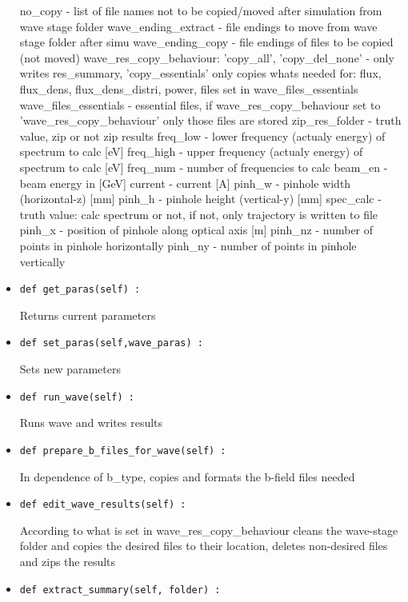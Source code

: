 \documentclass[
12pt,%
a4paper,  %
twoside        %
]{report}
\begin{document}
\begin{landscape}
\begin{itemize}
no\_copy - list of file names not to be copied/moved after simulation from wave stage folder
wave\_ending\_extract - file endings to move from wave stage folder after simu
wave\_ending\_copy - file endings of files to be copied (not moved)
wave\_res\_copy\_behaviour:
'copy\_all', 'copy\_del\_none' - only writes res\_summary, 'copy\_essentials' 
only copies whats needed for: flux, flux\_dens, flux\_dens\_distri, power, files 
set in wave\_files\_essentials
wave\_files\_essentials - essential files, if wave\_res\_copy\_behaviour set to 'wave\_res\_copy\_behaviour' 
only those files are stored
zip\_res\_folder - truth value, zip or not zip results
freq\_low - lower frequency (actualy energy) of spectrum to calc [eV]
freq\_high - upper frequency (actualy energy) of spectrum to calc [eV]
freq\_num - number of frequencies to calc
beam\_en - beam energy in [GeV]
current - current [A]
pinh\_w - pinhole width (horizontal-z) [mm]
pinh\_h - pinhole height (vertical-y) [mm]
spec\_calc - truth value: calc spectrum or not, if not, only trajectory is written to file
pinh\_x - position of pinhole along optical axis [m]
pinh\_nz - number of points in pinhole horizontally
pinh\_ny - number of points in pinhole vertically
\item \begin{verbatim}
def get_paras(self) :
\end{verbatim}
Returns current parameters
\item \begin{verbatim}
def set_paras(self,wave_paras) :
\end{verbatim}
Sets new parameters
\item \begin{verbatim}
def run_wave(self) :
\end{verbatim}
Runs wave and writes results
\item \begin{verbatim}
def prepare_b_files_for_wave(self) :
\end{verbatim}
In dependence of b\_type, copies and formats the b-field files needed
\item \begin{verbatim}
def edit_wave_results(self) :
\end{verbatim}
According to what is set in wave\_res\_copy\_behaviour cleans the wave-stage folder 
and copies the desired files to their location, deletes non-desired files 
and zips the results
\item \begin{verbatim}
def extract_summary(self, folder) :

\end{verbatim}
\end{itemize}
\end{landscape}
\end{document}
